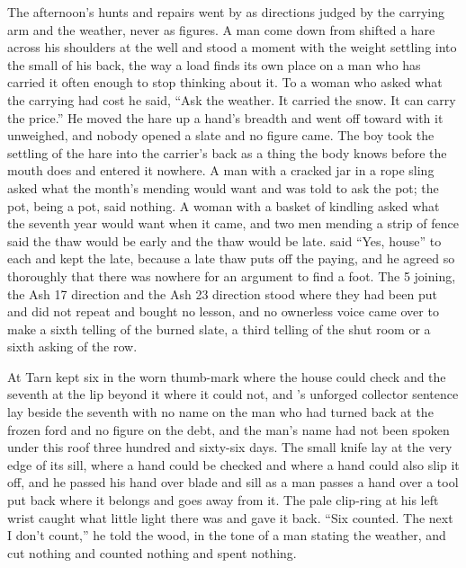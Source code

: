 \scenebreak

The afternoon's hunts and repairs went by as directions judged by the carrying arm and the weather, never as figures. A man come down from  shifted a hare across his shoulders at the well and stood a moment with the weight settling into the small of his back, the way a load finds its own place on a man who has carried it often enough to stop thinking about it. To a woman who asked what the carrying had cost he said, “Ask the weather. It carried the snow. It can carry the price.” He moved the hare up a hand's breadth and went off toward  with it unweighed, and nobody opened a slate and no figure came. The boy took the settling of the hare into the carrier's back as a thing the body knows before the mouth does and entered it nowhere. A man with a cracked jar in a rope sling asked what the month's mending would want and was told to ask the pot; the pot, being a pot, said nothing. A woman with a basket of kindling asked what the seventh year would want when it came, and two men mending a strip of fence said the thaw would be early and the thaw would be late.  said “Yes, house” to each and kept the late, because a late thaw puts off the paying, and he agreed so thoroughly that there was nowhere for an argument to find a foot. The  5 joining, the Ash 17 direction and the Ash 23 direction stood where they had been put and did not repeat and bought no lesson, and no ownerless voice came over  to make a sixth telling of the burned slate, a third telling of the shut room or a sixth asking of the row.

At  Tarn kept six in the worn thumb-mark where the house could check and the seventh at the lip beyond it where it could not, and 's unforged collector sentence lay beside the seventh with no name on the man who had turned back at the frozen ford and no figure on the debt, and the man's name had not been spoken under this roof three hundred and sixty-six days. The small knife lay at the very edge of its sill, where a hand could be checked and where a hand could also slip it off, and he passed his hand over blade and sill as a man passes a hand over a tool put back where it belongs and goes away from it. The pale clip-ring at his left wrist caught what little light there was and gave it back. “Six counted. The next I don't count,” he told the wood, in the tone of a man stating the weather, and cut nothing and counted nothing and spent nothing.

